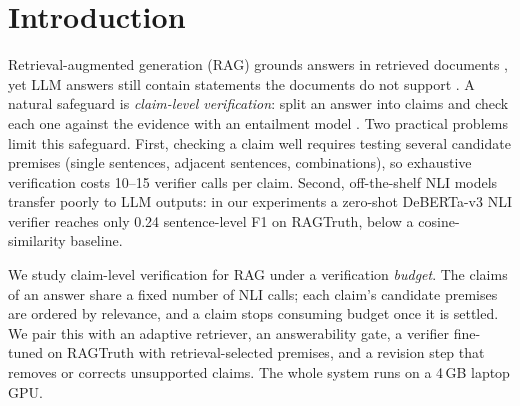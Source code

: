 \section{Introduction}
\label{sec:intro}

Retrieval-augmented generation (RAG) grounds answers in retrieved documents \citep{lewis2020rag}, yet LLM answers still contain statements the documents do not support \citep{niu2024ragtruth}.
A natural safeguard is \emph{claim-level verification}: split an answer into claims and check each one against the evidence with an entailment model \citep{min2023factscore,gao2023rarr,tang2024minicheck}.
Two practical problems limit this safeguard.
First, checking a claim well requires testing several candidate premises (single sentences, adjacent sentences, combinations), so exhaustive verification costs 10--15 verifier calls per claim.
Second, off-the-shelf NLI models transfer poorly to LLM outputs: in our experiments a zero-shot DeBERTa-v3 NLI verifier reaches only 0.24 sentence-level F1 on RAGTruth, below a cosine-similarity baseline.

We study claim-level verification for RAG under a verification \emph{budget}.
The claims of an answer share a fixed number of NLI calls; each claim's candidate premises are ordered by relevance, and a claim stops consuming budget once it is settled.
We pair this with an adaptive retriever, an answerability gate, a verifier fine-tuned on RAGTruth with retrieval-selected premises, and a revision step that removes or corrects unsupported claims.
The whole system runs on a 4\,GB laptop GPU.

